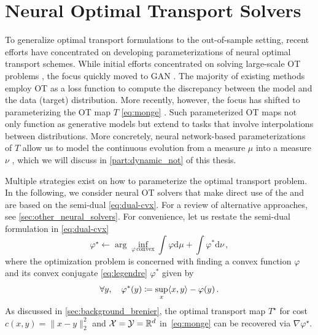 \section{Neural Optimal Transport Solvers} \label{sec:neural_solvers}

To generalize optimal transport formulations to the out-of-sample setting, recent efforts have concentrated on developing parameterizations of neural optimal transport schemes.
While initial efforts concentrated on solving large-scale \acrshort{OT} problems \citep{seguy2018large}, the focus quickly moved to \acrfull{GAN} \citep{arjovsky2017wasserstein, genevay2018learning}.
The majority of existing methods employ \acrshort{OT} as a loss function to compute the discrepancy between the model and the data (target) distribution. 
More recently, however, the focus has shifted to parameterizing the \acrshort{OT} map $T$ \eqref{eq:monge} \citep{yang2018scalable, rout2021generative, daniels2021score}. Such parameterized OT maps not only function as generative models but extend to tasks that involve interpolations between distributions. More concretely, neural network-based parameterizations of $T$ allow us to model the continuous evolution from a measure $\mu$ into a measure $\nu$ \citep{tong2020trajectorynet}, which we will discuss in \cref{part:dynamic_not} of this thesis.

Multiple strategies exist on how to parameterize the optimal transport problem.
In the following, we consider neural \acrshort{OT} solvers that make direct use of the  and are based on the semi-dual \eqref{eq:dual-cvx}. For a review of alternative approaches, see \cref{sec:other_neural_solvers}.
For convenience, let us restate the semi-dual formulation in \eqref{eq:dual-cvx}
\begin{equation*}
	\varphi^\star \leftarrow \arg\inf_{\varphi\, \text{convex}} \int \varphi \textrm{d}\mu + \int \varphi^*\textrm{d}\nu\,,
\end{equation*}
where the optimization problem is concerned with finding a convex function $\varphi$ and its convex conjugate \eqref{eq:legendre} $\varphi^*$ given by
\begin{equation} \label{eq:varphi_conjugate}
	\forall y, \quad \varphi^*(y) \coloneqq \sup _x \langle x, y\rangle-\varphi(y)\,.	
\end{equation}
As discussed in \cref{sec:background_brenier}, the optimal transport map $T^\star$ for cost $c(x,y) = \|x-y\|^2_2$ and ${\mathcal{X}} = {\mathcal{Y}} = \mathbb{R}^d$ in~\eqref{eq:monge} can be recovered via $\nabla \varphi^\star$.

